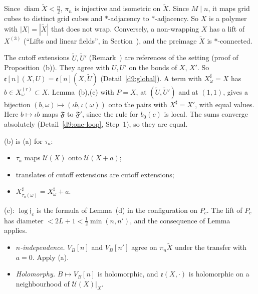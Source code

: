 \begin{detail}\label{d9:one-loop-local}
\begin{step}[(a)]
Since $\operatorname{diam}\tilde X<\frac n2$, $\pi_n$ is injective and isometric on $\tilde X$. Since $M\mid n$, it maps grid cubes to distinct grid cubes and $*$-adjacency to $*$-adjacency. So $X$ is a polymer with $|X|=|\tilde X|$ that does not wrap. Conversely, a non-wrapping $X$ has a lift of $X^{(3)}$ (``Lifts and linear fields'', in Section~), and the preimage $\tilde X$ is $*$-connected.

The cutoff extensions $\tilde U,\tilde U'$ (Remark~) are references of the setting (proof of Proposition~(b)). They agree with $U,U'$ on the bonds of $X$, $X'$. So $\mathfrak e[n](X,U)=\mathfrak e[n](X,\tilde U)$ (Detail~\ref{d9:global}). A term with $X^\sharp_\omega=X$ has $b\in X^{(r)}_\omega\subset X$. Lemma~(b),(c) with $P=X$, at $(\tilde U,\tilde U')$ and at $(1,1)$, gives a bijection $(b,\omega)\mapsto(\iota b,\iota(\omega))$ onto the pairs with $X^\sharp=X'$, with equal values. Here $b\mapsto\iota b$ maps $\mathfrak F$ to $\mathfrak F'$, since the rule for $b_0(c)$ is local. The sums converge absolutely (Detail~\ref{d9:one-loop}, Step~1), so they are equal.
\end{step}
\begin{step}[(b), (c)]
(b) is (a) for $\tau_a$:
\begin{itemize}
\item $\tau_a$ maps $\mathcal U(X)$ onto $\mathcal U(X+a)$;
\item translates of cutoff extensions are cutoff extensions;
\item $X^\sharp_{\tau_a(\omega)}=X^\sharp_\omega+a$.
\end{itemize}
(c): $\log\mathfrak j_c$ is the formula of Lemma~(d) in the configuration on $P_c$. The lift of $P_c$ has diameter $<2L+1<\frac12\min(n,n')$, and the consequence of Lemma~ applies.
\end{step}
\begin{step}[(d)]
\begin{itemize}
\item \emph{$n$-independence.} $V_B[n]$ and $V_B[n']$ agree on $\pi_n\tilde X$ under the transfer with $a=0$. Apply (a).
\item \emph{Holomorphy.} $B\mapsto V_B[n]$ is holomorphic, and $\mathfrak e(X,\cdot)$ is holomorphic on a neighbourhood of $\mathcal U(X)|_X$.

\end{itemize}
\end{step}
\end{detail}
